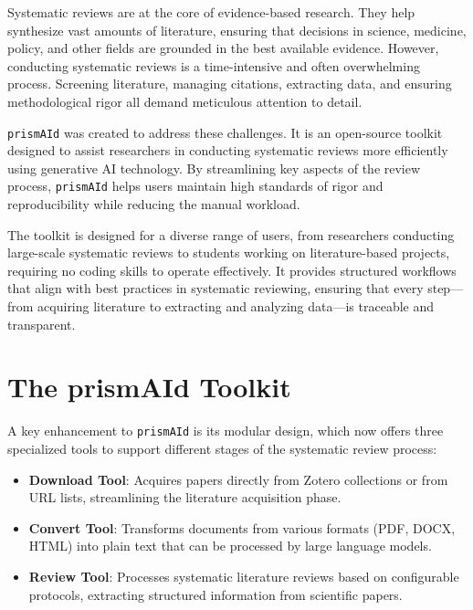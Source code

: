\label{chap:intro}

Systematic reviews are at the core of evidence-based research. They help synthesize vast amounts of literature, ensuring that decisions in science, medicine, policy, and other fields are grounded in the best available evidence. However, conducting systematic reviews is a time-intensive and often overwhelming process. Screening literature, managing citations, extracting data, and ensuring methodological rigor all demand meticulous attention to detail.

\texttt{prismAId} was created to address these challenges. It is an open-source toolkit designed to assist researchers in conducting systematic reviews more efficiently using generative AI technology. By streamlining key aspects of the review process, \texttt{prismAId} helps users maintain high standards of rigor and reproducibility while reducing the manual workload.

The toolkit is designed for a diverse range of users, from researchers conducting large-scale systematic reviews to students working on literature-based projects, requiring no coding skills to operate effectively. It provides structured workflows that align with best practices in systematic reviewing, ensuring that every step—from acquiring literature to extracting and analyzing data—is traceable and transparent.

\bigskip

\section{The prismAId Toolkit}

A key enhancement to \texttt{prismAId} is its modular design, which now offers three specialized tools to support different stages of the systematic review process:

\begin{itemize}
    \item \textbf{Download Tool}: Acquires papers directly from Zotero collections or from URL lists, streamlining the literature acquisition phase.

    \item \textbf{Convert Tool}: Transforms documents from various formats (PDF, DOCX, HTML) into plain text that can be processed by large language models.

    \item \textbf{Review Tool}: Processes systematic literature reviews based on configurable protocols, extracting structured information from scientific papers.
\end{itemize}

